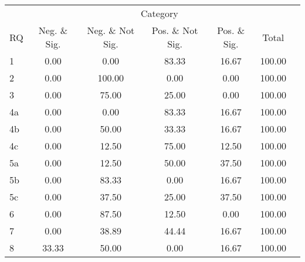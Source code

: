 \begin{tabular}{lcccccc}
\hline
\hline
 & \multicolumn{5}{c}{Category} \\
RQ&Neg. \& Sig.&Neg. \& Not Sig.&Pos. \& Not Sig.&Pos. \& Sig.&Total \\
%
\hline
1&0.00&0.00&83.33&16.67&100.00 \\
2&0.00&100.00&0.00&0.00&100.00 \\
3&0.00&75.00&25.00&0.00&100.00 \\
4a&0.00&0.00&83.33&16.67&100.00 \\
4b&0.00&50.00&33.33&16.67&100.00 \\
4c&0.00&12.50&75.00&12.50&100.00 \\
5a&0.00&12.50&50.00&37.50&100.00 \\
5b&0.00&83.33&0.00&16.67&100.00 \\
5c&0.00&37.50&25.00&37.50&100.00 \\
6&0.00&87.50&12.50&0.00&100.00 \\
7&0.00&38.89&44.44&16.67&100.00 \\
8&33.33&50.00&0.00&16.67&100.00 \\
\hline
\hline
\end{tabular}
